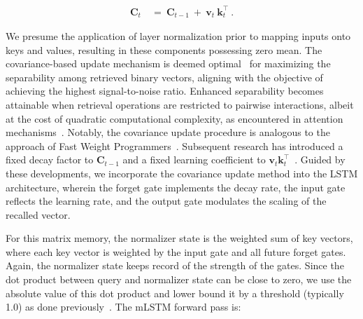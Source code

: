 \begin{align}
\mathbf{C}_t \ &= \ \mathbf{C}_{t-1} \ + \ \mathbf{v}_{t} \ \mathbf{k}_t^\top \ .
\end{align}

We presume the application of layer normalization prior to mapping inputs onto keys and values, resulting in these components possessing zero mean. The covariance-based update mechanism is deemed optimal~\citep{Dayan:91} for maximizing the separability among retrieved binary vectors, aligning with the objective of achieving the highest signal-to-noise ratio. Enhanced separability becomes attainable when retrieval operations are restricted to pairwise interactions, albeit at the cost of quadratic computational complexity, as encountered in attention mechanisms~\citep{Krotov:16,Krotov:17,Ramsauer:21}. Notably, the covariance update procedure is analogous to the approach of Fast Weight Programmers~\citep{Schmidhuber:92ncfastweights,Schlag:21}. Subsequent research has introduced a fixed decay factor to $\mathbf{C}_{t-1}$ and a fixed learning coefficient to 
$\mathbf{v}_{t} \mathbf{k}_t ^\top$~\citep{Ba:16}.
Guided by these developments, we incorporate the covariance update method into the LSTM architecture, wherein the forget gate implements the decay rate, the input gate reflects the learning rate, and the output gate modulates the scaling of the recalled vector.

For this matrix memory, the normalizer state is the weighted sum of key vectors, where each key vector is weighted by the input gate and all future forget gates. Again, the normalizer state keeps record of the strength of the gates. Since the dot product between query and normalizer state can be close to zero, we use the absolute value of this dot product and lower bound it by a threshold (typically 1.0) as done previously~\citep{Sun:23arxiv}. The mLSTM forward pass is:


